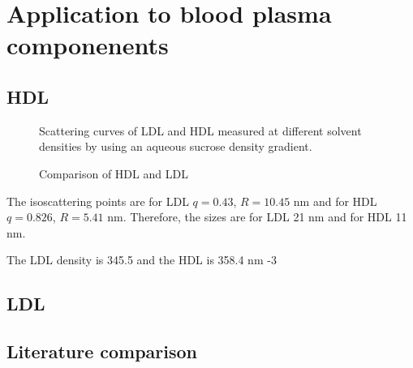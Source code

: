 



\section{Application to blood plasma componenents}
\subsection{HDL}
\begin{figure}
	\centering
		\subfloat[HDL]{\resizebox{0.44\linewidth}{!}{}\label{fig:HDLContinuousSAXS}}
		\subfloat[LDL]{\resizebox{0.44\linewidth}{!}{}\label{fig:LDLContinuousSAXS}}
		\caption{Scattering curves of LDL and HDL measured at different solvent densities by using an aqueous sucrose density gradient.}
\end{figure}

\begin{figure}
	\centering
		\caption{Comparison of HDL and LDL}
\end{figure}

The isoscattering points are for LDL $q=0.43$, $R=10.45$ nm and for HDL $q=0.826$, $R=5.41$ nm. Therefore, the sizes are for LDL 21 nm and for HDL 11 nm.

The LDL density is 345.5 and the HDL is 358.4 nm -3

\subsection{LDL}
\subsection{Literature comparison}

